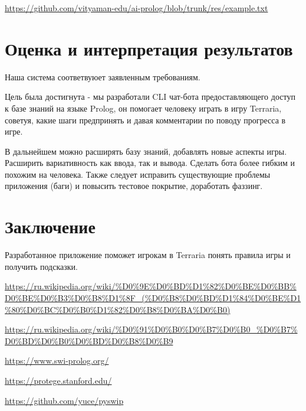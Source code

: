 \documentclass{article}
\begin{document}
\url{https://github.com/vityaman-edu/ai-prolog/blob/trunk/res/example.txt}


\section{Оценка и интерпретация результатов}

Наша система соответвуюет заявленным требованиям.

Цель была достигнута - мы разработали CLI чат-бота предоставляющего
доступ к базе знаний на языке Prolog, он помогает человеку
играть в игру Terraria, советуя, какие шаги предпринять и
давая комментарии по поводу прогресса в игре.

В дальнейшем можно расширять базу знаний, добавлять новые аспекты
игры. Расширить вариативность как ввода, так и вывода. Сделать
бота более гибким и похожим на человека. Также следует исправить
существующие проблемы приложения (баги) и повысить тестовое покрытие,
доработать фаззинг.

\section{Заключение}

Разработанное приложение поможет игрокам в Terraria понять
правила игры и получить подсказки.

\begin{thebibliography}{9}

  \url{https://ru.wikipedia.org/wiki/%D0%9E%D0%BD%D1%82%D0%BE%D0%BB%D0%BE%D0%B3%D0%B8%D1%8F_(%D0%B8%D0%BD%D1%84%D0%BE%D1%80%D0%BC%D0%B0%D1%82%D0%B8%D0%BA%D0%B0)}

  \url{https://ru.wikipedia.org/wiki/%D0%91%D0%B0%D0%B7%D0%B0_%D0%B7%D0%BD%D0%B0%D0%BD%D0%B8%D0%B9}

  \url{https://www.swi-prolog.org/}

  \url{https://protege.stanford.edu/}

  \url{https://github.com/yuce/pyswip}

\end{thebibliography}
\end{document}
